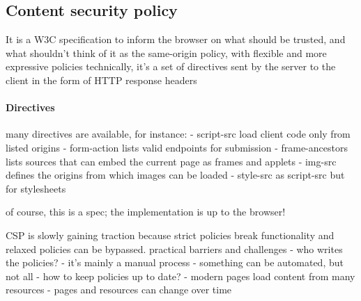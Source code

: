 \subsection{Content security policy}
It is a W3C specification to inform the browser on
what should be trusted, and what shouldn’t
think of it as the same-origin policy, with flexible and
more expressive policies
technically, it's a set of directives sent by the
server to the client in the form of HTTP
response headers

\paragraph*{Directives}
many directives are available, for instance:
- script-src load client code only from listed origins
- form-action lists valid endpoints for submission
- frame-ancestors lists sources that can embed the
current page as frames and applets
- img-src defines the origins from which images can
be loaded
- style-src as script-src but for stylesheets

of course, this is a spec; the
implementation is up to the browser!

CSP is slowly gaining traction because strict policies break functionality and relaxed policies can be bypassed. 
practical barriers and challenges
- who writes the policies?
- it's mainly a manual process
- something can be automated, but not all
- how to keep policies up to date?
- modern pages load content from many resources
- pages and resources can change over time
